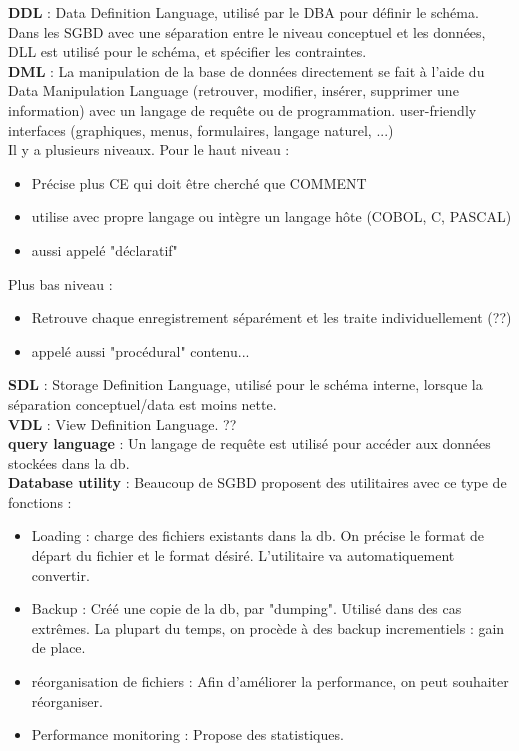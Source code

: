 \textbf{DDL} :
Data Definition Language, utilisé par le DBA pour définir le schéma.
Dans les SGBD avec une séparation entre le niveau conceptuel et les données, 
DLL est utilisé pour le schéma, et spécifier les contraintes.\\
\textbf{DML} : 
La manipulation de la base de données directement se fait à l'aide du 
Data Manipulation Language (retrouver, modifier, insérer, supprimer une information) avec 
un langage de requête ou de programmation.
user-friendly interfaces (graphiques, menus, formulaires, langage naturel, ...)\\
Il y a plusieurs niveaux. Pour le haut niveau : 
\begin{itemize}
\item Précise plus CE qui doit être cherché que COMMENT
\item utilise avec propre langage ou intègre un langage hôte (COBOL, C, PASCAL)
\item aussi appelé "déclaratif"
\end{itemize}
Plus bas niveau :
\begin{itemize}
\item Retrouve chaque enregistrement séparément et les traite individuellement (??)
\item appelé aussi "procédural"
contenu...
\end{itemize}

\textbf{SDL} : Storage Definition Language, utilisé pour le schéma interne, lorsque la séparation conceptuel/data est moins nette.\\
\textbf{VDL} : View Definition Language. ?? \\
\textbf{query language} : Un langage de requête est utilisé pour accéder aux données stockées dans la db. \\
\textbf{Database utility} : 
Beaucoup de SGBD proposent des utilitaires avec ce type de fonctions :
\begin{itemize}
	\item Loading : charge des fichiers existants dans la db. On précise le 
	format de départ du fichier et le format désiré. L'utilitaire 
	va automatiquement convertir. 
	 \item Backup : Créé une copie de la db, par "dumping". Utilisé dans des 
	 cas extrêmes. La plupart du temps, on procède à des backup incrementiels : gain de place.
	 \item réorganisation de fichiers : Afin d'améliorer la performance, on peut souhaiter réorganiser.
	 \item Performance monitoring : Propose des statistiques.
\end{itemize}

